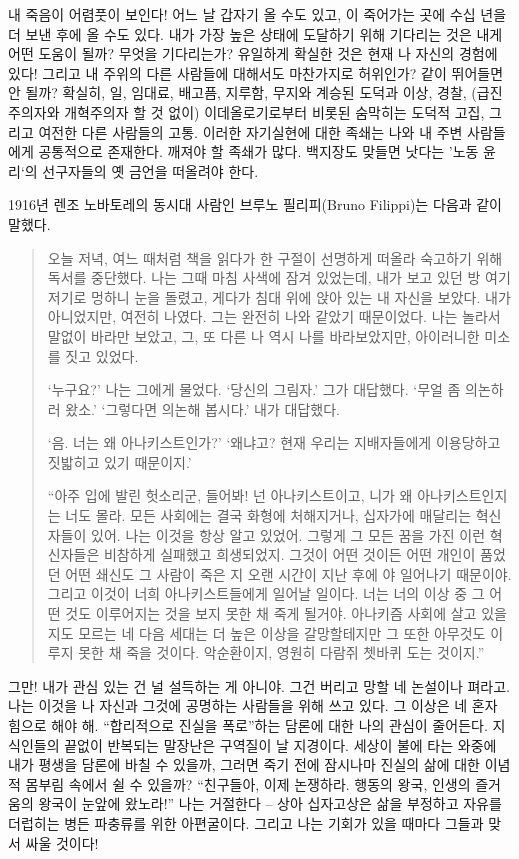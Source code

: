 \documentclass[10pt, b6paper, openany]{memoir}
\begin{document}
\begin{article}
내 죽음이 어렴풋이 보인다! 어느 날 갑자기 올 수도 있고, 이 죽어가는 곳에 수십 년을 더 보낸 후에 올 수도 있다. 내가 가장 높은 상태에 도달하기 위해 기다리는 것은 내게 어떤 도움이 될까? 무엇을 기다리는가? 유일하게 확실한 것은 현재 나 자신의 경험에 있다! 그리고 내 주위의 다른 사람들에 대해서도 마찬가지로 허위인가? 같이 뛰어들면 안 될까? 확실히, 일, 임대료, 배고픔, 지루함, 무지와 계승된 도덕과 이상, 경찰, (급진주의자와 개혁주의자 할 것 없이) 이데올로기로부터 비롯된 숨막히는 도덕적 고집, 그리고 여전한 다른 사람들의 고통. 이러한 자기실현에 대한 족쇄는 나와 내 주변 사람들에게 공통적으로 존재한다. 깨져야 할 족쇄가 많다. 백지장도 맞들면 낫다는 '노동 윤리`의 선구자들의 옛 금언을 떠올려야 한다.

1916년 렌조 노바토레의 동시대 사람인 브루노 필리피(Bruno Filippi)는 다음과 같이 말했다.

\begin{quote}
오늘 저녁, 여느 때처럼 책을 읽다가 한 구절이 선명하게 떠올라 숙고하기 위해 독서를 중단했다. 나는 그때 마침 사색에 잠겨 있었는데, 내가 보고 있던 방 여기저기로 멍하니 눈을 돌렸고, 게다가 침대 위에 앉아 있는 내 자신을 보았다. 내가 아니었지만, 여전히 나였다. 그는 완전히 나와 같았기 때문이었다. 나는 놀라서 말없이 바라만 보았고, 그, 또 다른 나 역시 나를 바라보았지만, 아이러니한 미소를 짓고 있었다. 

`누구요?' 나는 그에게 물었다. `당신의 그림자.' 그가 대답했다. `무얼 좀 의논하러 왔소.' `그렇다면 의논해 봅시다.' 내가 대답했다. 

`음. 너는 왜 아나키스트인가?' `왜냐고? 현재 우리는 지배자들에게 이용당하고 짓밟히고 있기 때문이지.' 

``아주 입에 발린 헛소리군, 들어봐! 넌 아나키스트이고, 니가 왜 아나키스트인지는 너도 몰라. 모든 사회에는 결국 화형에 처해지거나, 십자가에 매달리는 혁신자들이 있어. 나는 이것을 항상 알고 있었어. 그렇게 그 모든 꿈을 가진 이런 혁신자들은 비참하게 실패했고 희생되었지. 그것이 어떤 것이든 어떤 개인이 품었던 어떤 쇄신도 그 사람이 죽은 지 오랜 시간이 지난 후에 야 일어나기 때문이야. 그리고 이것이 너희 아나키스트들에게 일어날 일이다. 너는 너의 이상 중 그 어떤 것도 이루어지는 것을 보지 못한 채 죽게 될거야. 아나키즘 사회에 살고 있을지도 모르는 네 다음 세대는 더 높은 이상을 갈망할테지만 그 또한 아무것도 이루지 못한 채 죽을 것이다. 악순환이지, 영원히 다람쥐 쳇바퀴 도는 것이지.''\cite{ibk:bruno2008}
\end{quote}

그만! 내가 관심 있는 건 널 설득하는 게 아니야. 그건 버리고 망할 네 논설이나 펴라고. 나는 이것을 나 자신과 그것에 공명하는 사람들을 위해 쓰고 있다. 그 이상은 네 혼자 힘으로 해야 해. ``합리적으로 진실을 폭로''하는 담론에 대한 나의 관심이 줄어든다. 지식인들의 끝없이 반복되는 말장난은 구역질이 날 지경이다. 세상이 불에 타는 와중에 내가 평생을 담론에 바칠 수 있을까, 그러면 죽기 전에 잠시나마 진실의 삶에 대한 이념적 몸부림 속에서 쉴 수 있을까? ``친구들아, 이제 논쟁하라. 행동의 왕국, 인생의 즐거움의 왕국이 눈앞에 왔노라!'' 나는 거절한다 -- 상아 십자고상은 삶을 부정하고 자유를 더럽히는 병든 파충류를 위한 아편굴이다. 그리고 나는 기회가 있을 때마다 그들과 맞서 싸울 것이다!


\end{article}
\end{document}
